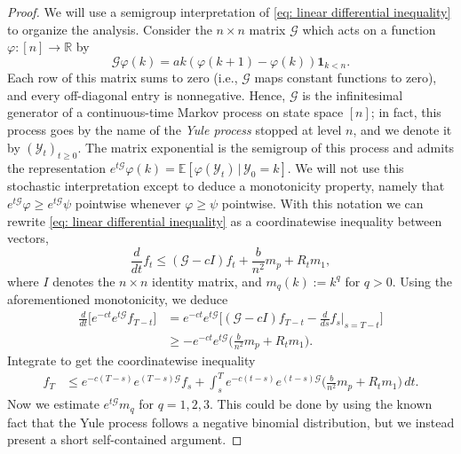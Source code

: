 \documentclass[11pt,reqno]{amsart}
\numberwithin{equation}{section}
\theoremstyle{definition}
\def\E{{\mathbb E}}
\def\R{{\mathbb R}}
\begin{document}
\begin{proof}
We will use a semigroup interpretation of \eqref{eq: linear differential inequality} to organize the analysis.
Consider the $n \times n$ matrix $\mathcal G$ which acts on a function $\varphi : [n] \to \R$ by
\[\mathcal G \varphi(k)=ak(\varphi(k+1)-\varphi(k))\mathbf{1}_{k<n}.\]
Each row of this matrix sums to zero (i.e., $\mathcal G$ maps constant functions to zero), and every off-diagonal entry is nonnegative. Hence, $\mathcal G$ is the infinitesimal generator of a continuous-time Markov process on state space $[n]$; in fact, this process goes by the name of the \emph{Yule process} stopped at level $n$, and we denote it by $(\mathcal Y_t)_{t\geq 0}$. The matrix exponential is the semigroup of this process and admits the representation $e^{t\mathcal G}\varphi(k)=\E[\varphi(\mathcal Y_t)\,|\,\mathcal Y_0=k]$. We will not use this stochastic interpretation except to deduce a monotonicity property, namely that $e^{t\mathcal G}\varphi \ge e^{t\mathcal G}\psi$ pointwise whenever $\varphi \ge \psi$ pointwise.
With this notation we can rewrite \eqref{eq: linear differential inequality} as a coordinatewise inequality between vectors,
\begin{equation*}
    \frac{d}{dt}f_t \leq (\mathcal G - cI)f_t + \frac{b}{n^2}m_p + R_tm_1,
\end{equation*}
where $I$ denotes the $n \times n$ identity matrix, and $m_q(k) := k^q$ for $q > 0$.
Using the aforementioned monotonicity, we deduce
\begin{align*}
    \frac{d}{dt}\Big[e^{-ct} e^{t\mathcal G}f_{T-t} \Big] &= e^{-ct} e^{t\mathcal G}\Big[(\mathcal G - cI) f_{T-t}-\frac{d}{ds}f_{s}\big\vert_{s=T-t}\Big] \\
    &\ge - e^{-ct}e^{t\mathcal G}\big(\frac{b}{n^2}m_p + R_tm_1\big).
\end{align*}
Integrate to get the coordinatewise inequality
\begin{align}
\label{eq: semigroup after gronwall}
    f_{T} &\le e^{-c(T-s)}e^{(T-s)\mathcal G} f_s + \int_s^Te^{-c(t-s)}e^{(t-s)\mathcal G}\Big(\frac{b}{n^2} m_p + R_tm_1\Big)\,dt.
\end{align}
Now we estimate $e^{t\mathcal G}m_q$ for $q=1,2,3$. This could be done by using the known fact that the Yule process follows a negative binomial distribution, but we instead present a short self-contained argument. 


\end{proof}
\end{document}
